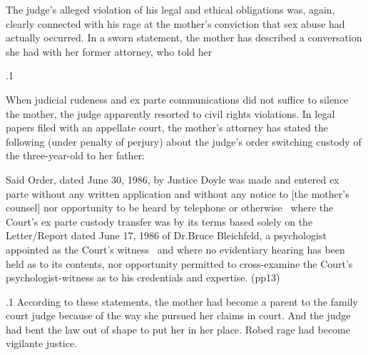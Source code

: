 \documentclass[11pt, twoside]{article}
\begin{document}
{{\nip{}%
The judge’s alleged violation of his legal and ethical obligations was,
again, clearly connected with his rage at the mother’s conviction that
sex abuse had actually occurred. In a sworn statement, the mother has
described a conversation she had with her former attorney, who told her
}%

\p.1{%
When judicial rudeness and ex parte communications did not suffice
to silence the mother, the judge apparently resorted to civil rights violations. In legal papers filed with an appellate court, the mother’s attorney
has stated the following (under penalty of perjury) about the judge’s
order switching custody of the three-year-old to her father:

\begin{blockQuote}
Said Order, dated June 30, 1986, by Justice Doyle was made and
entered ex parte without any written application and without any
notice to [the mother’s counsel] nor opportunity to be heard by
telephone or otherwise \ellThree{2pt}{2pt}\ where the Court’s ex parte custody
transfer was by its terms based solely on the Letter/Report dated
June 17, 1986 of Dr.\@ Bruce Bleichfeld, a psychologist appointed as
the Court’s witness \ellThree{2pt}{2pt}\ and where no evidentiary hearing has been
held as to its contents, nor opportunity permitted to cross-examine
the Court’s psychologist-witness as to his credentials and
expertise. (pp\ellThree{2pt}{2pt}1\ndash{}3)
\end{blockQuote}

}%

\p.1{%
According to these statements, the mother had become a  parent
to the family court judge because of the way she pursued her claims in
court. And the judge had bent the law out of shape to put her in her
place. Robed rage had become vigilante justice.
}%

}
\end{document}
